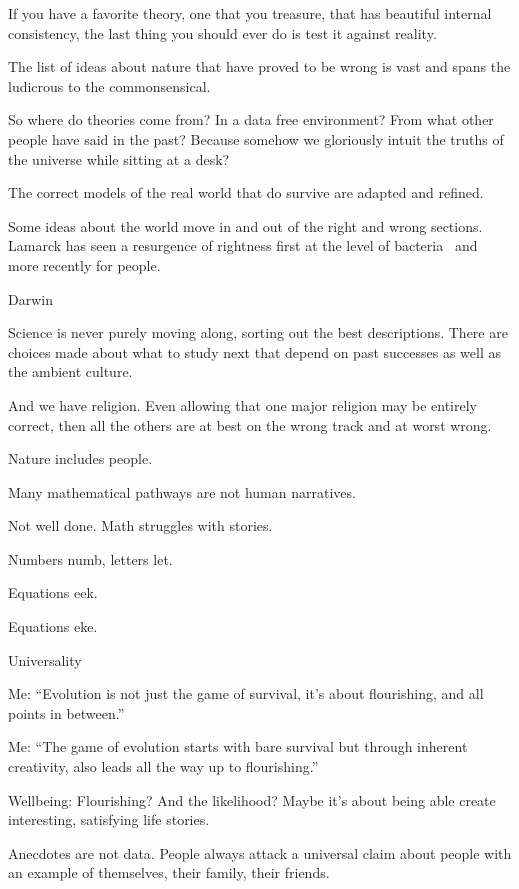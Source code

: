 If you have a favorite theory, one that
you treasure, that has beautiful internal
consistency, the last thing you should ever
do is test it against reality.

The list of ideas about nature that have
proved to be wrong is vast and spans
the ludicrous to the commonsensical.

So where do theories come from?
In a data free environment?
From what other people have said in the past?
Because somehow we gloriously intuit
the truths of the universe while sitting
at a desk?  


The correct models of the real
world that do survive are adapted
and refined.

Some ideas about the world move in
and out of the right and wrong sections.
Lamarck has seen a resurgence of rightness
first at the level of bacteria~\cite{bacteria}
and more recently for people.

Darwin

Science is never purely moving along,
sorting out the best descriptions.
There are choices made about what to
study next that depend on past successes
as well as the ambient culture.


And we have religion.  Even allowing
that one major religion may be entirely
correct, then all the others are at best
on the wrong track and at worst wrong.



Nature includes people.



Many mathematical pathways are not human narratives.

Not well done.  Math struggles with stories.

Numbers numb, letters let.

Equations eek.

Equations eke.


Universality




Me: ``Evolution is not just the game of survival, it's about flourishing,
and all points in between.''

Me: ``The game of evolution starts with bare survival but
through inherent creativity, also leads all the way up to flourishing.''


Wellbeing: Flourishing?  And the likelihood?
Maybe it's about being able create interesting,
satisfying life stories.

Anecdotes are not data.
People always attack a universal claim 
about people with an example of themselves,
their family, their friends.
